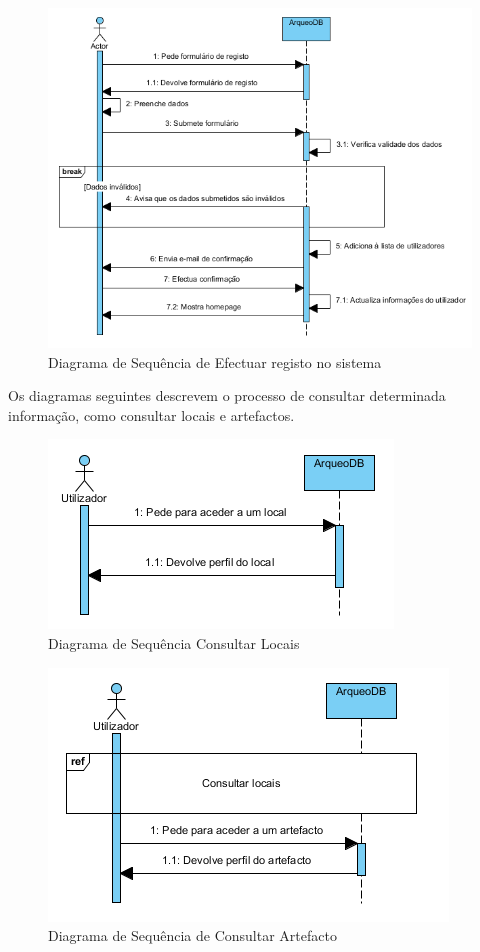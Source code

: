 ﻿\documentclass[12pt,a4paper]{article}
\begin{document}
\begin{figure}[h!]
\centering
\includegraphics[scale=1]{sequencia/registo}
\caption{Diagrama de Sequência de Efectuar registo no sistema} 
\end{figure}

\clearpage

Os diagramas seguintes descrevem o processo de consultar determinada informação, como consultar locais e artefactos.\\

\begin{figure}[h!]
\centering
\includegraphics[scale=1]{sequencia/consultarlocais}
\caption{Diagrama de Sequência Consultar Locais} 
\end{figure}

\begin{figure}[h!]
\centering
\includegraphics[scale=1]{sequencia/consultarartefacto}
\caption{Diagrama de Sequência de Consultar Artefacto} 
\end{figure}
\end{document}
